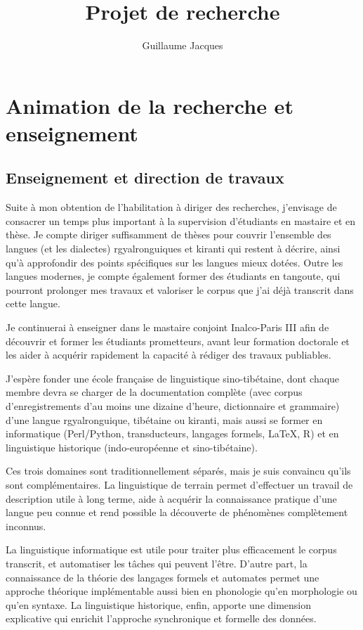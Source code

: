 \documentclass[oldfontcommands,oneside,a4paper,11pt]{article}
\begin{document}
\title{Projet de recherche} 
\author{Guillaume Jacques}
\maketitle

\sloppy
\tableofcontents

\section{Animation de la recherche et enseignement}

\subsection{Enseignement et direction de travaux}
Suite à mon obtention de l'habilitation à diriger des recherches, j'envisage de consacrer un temps plus important à la supervision d'étudiants en mastaire et en thèse. Je compte diriger suffisamment de thèses pour couvrir l'ensemble des langues (et les dialectes) rgyalronguiques et kiranti qui restent à décrire, ainsi qu'à approfondir des points spécifiques sur les langues mieux dotées. Outre les langues modernes, je compte également former des étudiants en tangoute, qui pourront prolonger mes travaux et valoriser le corpus que j'ai déjà transcrit dans cette langue. 
 
Je continuerai à enseigner dans le mastaire conjoint Inalco-Paris III afin de découvrir et former les étudiants prometteurs, avant leur formation doctorale et les aider à acquérir rapidement la capacité à rédiger des travaux publiables.

J'espère  fonder une école française de linguistique sino-tibétaine, dont chaque membre devra se charger de la documentation complète (avec corpus d'enregistrements d'au moins une dizaine d'heure, dictionnaire et grammaire) d'une langue rgyalronguique, tibétaine ou  kiranti, mais aussi se former en informatique (Perl/Python, transducteurs, langages formels, \LaTeX, R)  et en linguistique historique (indo-européenne et sino-tibétaine).

Ces trois domaines sont traditionnellement séparés, mais je suis convaincu qu'ils sont complémentaires. La linguistique de terrain permet d'effectuer un travail de description utile à long terme, aide à acquérir la connaissance pratique d'une langue peu connue et rend possible la découverte de phénomènes complètement inconnus. 

 La linguistique informatique est utile pour traiter plus efficacement le corpus transcrit, et automatiser les tâches qui peuvent l'être. D'autre part, la connaissance de la théorie des langages formels et automates permet une approche théorique implémentable  aussi bien en phonologie qu'en morphologie ou qu'en syntaxe.
La linguistique historique, enfin, apporte une dimension explicative qui enrichit l'approche   synchronique et formelle des données.
\end{document}
